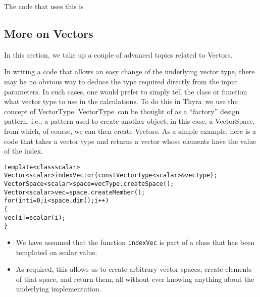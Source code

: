 \documentclass[12pt]{article}
\newcommand{\thyra}{{\sf Thyra}}
\renewcommand{\vector}{{\sf Vector}}
\newcommand{\vectorSpace}{{\sf VectorSpace}}
\newcommand{\vectorType}{{\sf VectorType}}
\newcommand{\lcode}[1]{{\tt #1}}
\newenvironment{dcode}{  \begin{center} 
    \begin{minipage}{.9\textwidth}
     \begin{alltt}}
{\end{alltt}
    \end{minipage}
  \end{center}}
\newcommand{\bdcode}{\begin{dcode}}
\newcommand{\edcode}{\end{dcode}}
\begin{document}
The code that uses this is 





\subsection{More on Vectors} \label{moreVec}

In this section, we take up a couple of advanced topics related to
\vector s.  

In writing a code that allows an easy change of the underlying vector
type, there may be no obvious way to deduce the type required directly
from the input parameters.  In such cases, one would prefer to simply
tell the class or function what vector type to use in the
calculations.  To do this in \thyra\ we use the concept of
\vectorType. \vectorType\ can be thought of as a ``factory'' design
pattern, i.e., a pattern used to create another object; in this case,
a \vectorSpace, from which, of course, we can then create \vector s. 
As a simple example, here is a code that takes a vector type and
returns a vector whose elements have the value of the index.
\bdcode
template <class scalar> 
Vector<scalar> indexVector(const VectorType<scalar>\& vecType);
VectorSpace<scalar> space = vecType.createSpace();  
Vector<scalar> vec = space.createMember(); 
for  (int i = 0; i < space.dim(); i++) 
  \{ 
    vec[i] = scalar(i); 
  \} 
\edcode

\begin{itemize}
    \item We have assumed that the function \lcode{indexVec} is part
  of a class that has been templated on scalar value.
    \item As required, this allows us to create arbitrary vector
  spaces, create elements of that space, and return them, all without
  ever knowing anything about the underlying implementation.  
\end{itemize}
\end{document}
